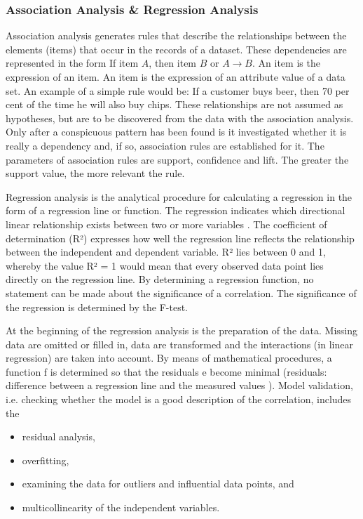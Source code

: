\subsubsection{Association Analysis \& Regression Analysis}

\glqq Association analysis generates rules that describe the relationships between the elements (items) that occur in the records of a dataset.\grqq \cite{Gluchowski:2006} These dependencies are represented in the form If item $A$, then item $B$ or $A \rightarrow B$. An item is the expression of an item. An item is the expression of an attribute value of a data set. An example of a simple rule would be: If a customer buys beer, then 70 per cent of the time he will also buy chips. These relationships are not assumed as hypotheses, but are to be discovered from the data with the association analysis. Only after a conspicuous pattern has been found is it investigated whether it is really a dependency and, if so, association rules are established for it. The parameters of association rules are support, confidence and lift. The greater the support value, the more relevant the rule.

Regression analysis is the analytical procedure for calculating a regression in the form of a regression line or function. The regression indicates which directional linear relationship exists between two or more variables \cite{Gluchowski:2006}. The coefficient of determination (R²) expresses how well the regression line reflects the relationship between the independent and dependent variable. R² lies between 0 and 1, whereby the value R² = 1 would mean that every observed data point lies directly on the regression line. By determining a regression function, no statement can be made about the significance of a correlation. The significance of the regression is determined by the F-test.


At the beginning of the regression analysis is the preparation of the data. Missing data are omitted or filled in, data are transformed and the interactions (in linear regression) are taken into account. By means of mathematical procedures, a function f is determined so that the residuals e become minimal (residuals: difference between a regression line and the measured values \cite{Kaehler:2011}). Model validation, i.e. checking whether the model is a good description of the correlation, includes the

\begin{itemize}
    \item residual analysis,
    \item overfitting,
    \item examining the data for outliers and influential data points, and
    \item multicollinearity of the independent variables.
\end{itemize}	

